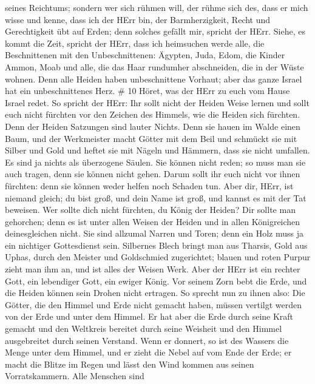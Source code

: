 seines Reichtums;  sondern wer sich rühmen will, der rühme
sich des, dass er mich wisse und kenne, dass ich der HErr bin, der
Barmherzigkeit, Recht und Gerechtigkeit übt auf Erden; denn solches
gefällt mir, spricht der HErr.  Siehe, es kommt die Zeit,
spricht der HErr, dass ich heimsuchen werde alle, die Beschnittenen mit
den Unbeschnittenen:  Ägypten, Juda, Edom, die Kinder
Ammon, Moab und alle, die das Haar rundumher abschneiden, die in der
Wüste wohnen. Denn alle Heiden haben unbeschnittene Vorhaut; aber das
ganze Israel hat ein unbeschnittenes Herz. \# 10  Höret, was
der HErr zu euch vom Hause Israel redet.  So spricht der
HErr: Ihr sollt nicht der Heiden Weise lernen und sollt euch nicht
fürchten vor den Zeichen des Himmels, wie die Heiden sich fürchten.
 Denn der Heiden Satzungen sind lauter Nichts. Denn sie
hauen im Walde einen Baum, und der Werkmeister macht Götter mit dem Beil
 und schmückt sie mit Silber und Gold und heftet sie mit
Nägeln und Hämmern, dass sie nicht umfallen.  Es sind ja
nichts als überzogene Säulen. Sie können nicht reden; so muss man sie
auch tragen, denn sie können nicht gehen. Darum sollt ihr euch nicht vor
ihnen fürchten: denn sie können weder helfen noch Schaden tun.
 Aber dir, HErr, ist niemand gleich; du bist groß, und dein
Name ist groß, und kannst es mit der Tat beweisen.  Wer
sollte dich nicht fürchten, du König der Heiden? Dir sollte man
gehorchen; denn es ist unter allen Weisen der Heiden und in allen
Königreichen deinesgleichen nicht.  Sie sind allzumal Narren
und Toren; denn ein Holz muss ja ein nichtiger Gottesdienst sein.
 Silbernes Blech bringt man aus Tharsis, Gold aus Uphas,
durch den Meister und Goldschmied zugerichtet; blauen und roten Purpur
zieht man ihm an, und ist alles der Weisen Werk.  Aber der
HErr ist ein rechter Gott, ein lebendiger Gott, ein ewiger König. Vor
seinem Zorn bebt die Erde, und die Heiden können sein Drohen nicht
ertragen.  So sprecht nun zu ihnen also: Die Götter, die
den Himmel und Erde nicht gemacht haben, müssen vertilgt werden von der
Erde und unter dem Himmel.  Er hat aber die Erde durch
seine Kraft gemacht und den Weltkreis bereitet durch seine Weisheit und
den Himmel ausgebreitet durch seinen Verstand.  Wenn er
donnert, so ist des Wassers die Menge unter dem Himmel, und er zieht die
Nebel auf vom Ende der Erde; er macht die Blitze im Regen und lässt den
Wind kommen aus seinen Vorratskammern.  Alle Menschen sind
